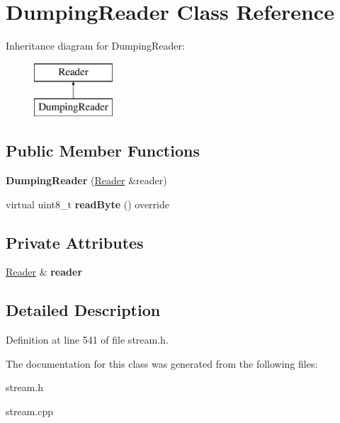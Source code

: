 \hypertarget{classDumpingReader}{\section{Dumping\+Reader Class Reference}
\label{classDumpingReader}
}
Inheritance diagram for Dumping\+Reader\+:\begin{figure}[H]
\begin{center}
\leavevmode
\includegraphics[height=2.000000cm]{classDumpingReader}
\end{center}
\end{figure}
\subsection*{Public Member Functions}
\begin{DoxyCompactItemize}
\item 
\hypertarget{classDumpingReader_a755c8f74a53a7941e26b5cd9015d0628}{{\bfseries Dumping\+Reader} (\hyperlink{classReader}{Reader} \&reader)}\label{classDumpingReader_a755c8f74a53a7941e26b5cd9015d0628}

\item 
\hypertarget{classDumpingReader_ad6dec8cbc74599edb22f49f4482b59f2}{virtual uint8\+\_\+t {\bfseries read\+Byte} () override}\label{classDumpingReader_ad6dec8cbc74599edb22f49f4482b59f2}

\end{DoxyCompactItemize}
\subsection*{Private Attributes}
\begin{DoxyCompactItemize}
\item 
\hypertarget{classDumpingReader_acdc03bb26c6b68623005c248bab5f0b0}{\hyperlink{classReader}{Reader} \& {\bfseries reader}}\label{classDumpingReader_acdc03bb26c6b68623005c248bab5f0b0}

\end{DoxyCompactItemize}


\subsection{Detailed Description}


Definition at line 541 of file stream.\+h.



The documentation for this class was generated from the following files\+:\begin{DoxyCompactItemize}
\item 
stream.\+h\item 
stream.\+cpp\end{DoxyCompactItemize}
